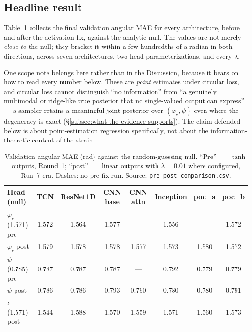 \subsection{Headline result}
\label{subsec:headline-result}

Table~\ref{tab:phicpsi:prepost} collects the final validation angular MAE for every architecture, before and after the activation fix, against the analytic null.
The values are not merely \emph{close to} the null; they bracket it within a few hundredths of a radian in both directions, across seven architectures, two head parameterizations, and every $\lambda$.

One scope note belongs here rather than in the Discussion, because it bears on how to read every number below.
These are \emph{point} estimates under circular loss, and circular loss cannot distinguish ``no information'' from ``a genuinely multimodal or ridge-like true posterior that no single-valued output can express'' --- a sampler retains a meaningful joint posterior over $(\varphi_c, \psi)$ even where the degeneracy is exact (\S\ref{subsec:what-the-evidence-supports}).
The claim defended below is about point-estimation regression specifically, not about the information-theoretic content of the strain.

\begin{table}[tbp]
    \centering
    \caption{Validation angular MAE (rad) against the random-guessing
    null. ``Pre'' $=$ $\tanh$ outputs, Round~1; ``post'' $=$ linear
    outputs with $\lambda = 0.01$ where configured, Run~7 era. Dashes: no
    pre-fix run. Source: \texttt{pre\_post\_comparison.csv}.}
    \label{tab:phicpsi:prepost}
    \small
    \begin{tabular}{@{}lccccccc@{}}
        \toprule
        Head (null)             & TCN   & ResNet1D & CNN base & CNN attn & Inception & poc\_a & poc\_b \\
        \midrule
        $\varphi_c$ (1.571) pre & 1.572 & 1.564    & 1.577    & ---      & 1.556     & ---    & 1.572  \\
        $\varphi_c$ post        & 1.579 & 1.578    & 1.578    & 1.577    & 1.573     & 1.580  & 1.572  \\
        $\psi$ (0.785) pre      & 0.787 & 0.787    & 0.787    & ---      & 0.792     & 0.779  & 0.779  \\
        $\psi$ post             & 0.786 & 0.786    & 0.793    & 0.790    & 0.780     & 0.780  & 0.791  \\
        $\iota$ (1.571) post    & 1.544 & 1.588    & 1.570    & 1.559    & 1.571     & 1.560  & 1.573  \\
        \bottomrule
    \end{tabular}
\end{table}

